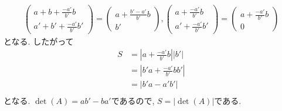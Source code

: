 \begin{remark}
\begin{align*}
\begin{pmatrix}
    a+b+\frac{-a'}{b'}b\\a'+b'+\frac{-a'}{b'}b'
    \end{pmatrix}
    =
    \begin{pmatrix}
    a+\frac{b'-a'}{b'}b\\b'
    \end{pmatrix},
  \begin{pmatrix}
    a+\frac{-a'}{b'}b\\a'+\frac{-a'}{b'}b'
  \end{pmatrix}
  =
    \begin{pmatrix}
    a+\frac{-a'}{b'}b\\0
  \end{pmatrix}
\end{align*}
  となる. したがって
  \begin{align*}
    S&=\left|a+\frac{-a'}{b'}b\right|\left|b'\right|\\
    &=\left|b'a+\frac{-a'}{b'}bb'\right|\\
    &=\left|b'a-a'b'\right|\\
  \end{align*}
  となる.
  $\det(A)=ab'-ba'$であるので,
  $S=|\det(A)|$である.
\end{remark}

